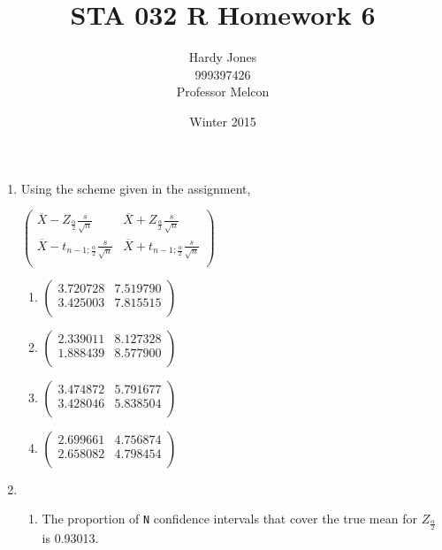 \documentclass[12pt,letterpaper]{article}
\title{STA 032 R Homework 6\vspace{-2ex}}
\author{Hardy Jones\\
        999397426\\
        Professor Melcon\vspace{-2ex}}
\date{Winter 2015}
\begin{document}
  \maketitle


  \begin{enumerate}
    \item
      Using the scheme given in the assignment,

      $
        \begin{pmatrix}
          \overline{X} - Z_{\frac{\alpha}{2}} \frac{s}{\sqrt{n}}
          & \overline{X} + Z_{\frac{\alpha}{2}} \frac{s}{\sqrt{n}} \\
          \overline{X} - t_{n-1;\frac{\alpha}{2}} \frac{s}{\sqrt{n}}
          & \overline{X} + t_{n-1;\frac{\alpha}{2}} \frac{s}{\sqrt{n}} \\
        \end{pmatrix}
      $
      \begin{enumerate}
        \item
          $
            \begin{pmatrix}
              \num{3.720728} & \num{7.519790} \\
              \num{3.425003} & \num{7.815515} \\
            \end{pmatrix}
          $
        \item
          $
            \begin{pmatrix}
              \num{2.339011} & \num{8.127328} \\
              \num{1.888439} & \num{8.577900} \\
            \end{pmatrix}
          $
        \item
          $
            \begin{pmatrix}
              \num{3.474872} & \num{5.791677} \\
              \num{3.428046} & \num{5.838504} \\
            \end{pmatrix}
          $
        \item
          $
            \begin{pmatrix}
              \num{2.699661} & \num{4.756874} \\
              \num{2.658082} & \num{4.798454} \\
            \end{pmatrix}
          $
      \end{enumerate}
    \item
      \begin{enumerate}
        \item
          The proportion of \texttt{N} confidence intervals that cover the true mean for $Z_{\frac{\alpha}{2}}$ is \num{0.93013}.


\end{enumerate}
\end{enumerate}
\end{document}
